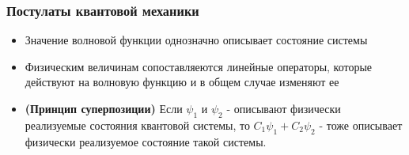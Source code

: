 \documentclass[a4paper,12pt]{article}
\begin{document}
\subsubsection*{Постулаты квантовой механики}
\begin{itemize}
\item Значение волновой функции однозначно описывает состояние системы
\item Физическим величинам сопоставляеются линейные операторы, которые действуют на волновую функцию и в общем случае изменяют ее
\item {\bf (Принцип суперпозиции)} Если $\psi_1$ и $\psi_2$ - описывают физически реализуемые состояния квантовой системы, то $C_1\psi_1 + C_2\psi_2$ - тоже описывает физически реализуемое состояние такой системы.
\end{itemize}
\end{document}
